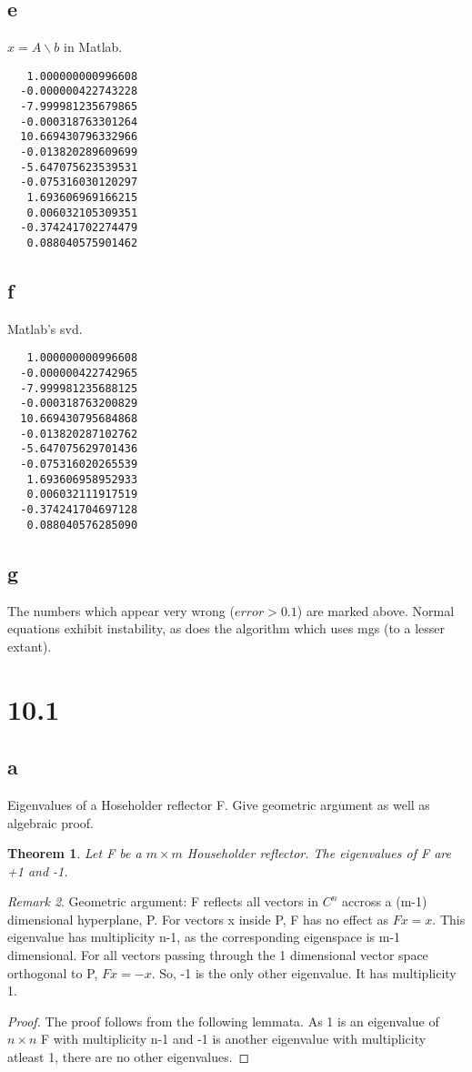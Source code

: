 \documentclass[10pt]{amsart}
\newtheorem{thm}{Theorem}[subsection]
\theoremstyle{remark}
\newtheorem{rem}[thm]{Remark}
\begin{document}
\subsection{e} $x=A\backslash b$ in Matlab.
\begin{verbatim}
   1.000000000996608
  -0.000000422743228
  -7.999981235679865
  -0.000318763301264
  10.669430796332966
  -0.013820289609699
  -5.647075623539531
  -0.075316030120297
   1.693606969166215
   0.006032105309351
  -0.374241702274479
   0.088040575901462
\end{verbatim}

\subsection{f} Matlab's svd.
\begin{verbatim}
   1.000000000996608
  -0.000000422742965
  -7.999981235688125
  -0.000318763200829
  10.669430795684868
  -0.013820287102762
  -5.647075629701436
  -0.075316020265539
   1.693606958952933
   0.006032111917519
  -0.374241704697128
   0.088040576285090
\end{verbatim}

\subsection{g} 
The numbers which appear very wrong ($error>0.1$) are marked above. Normal equations exhibit instability, as does the algorithm which uses mgs (to a lesser extant).

\section{10.1}
\subsection{a} Eigenvalues of a Hoseholder reflector F. Give geometric argument as well as algebraic proof.

\begin{thm}
 Let F be a $m \times m$ Householder reflector. The eigenvalues of F are +1 and -1.
\end{thm}
\begin{rem}
 Geometric argument: F reflects all vectors in $C^{n}$ accross a (m-1) dimensional hyperplane, P. For vectors x inside P, F has no effect as $Fx = x$. This eigenvalue has multiplicity n-1, as the corresponding eigenspace is m-1 dimensional. For all vectors passing through the 1 dimensional vector space orthogonal to P, $Fx = -x$. So, -1 is the only other eigenvalue. It has multiplicity 1.
\end{rem}
\begin{proof}
The proof follows from the following lemmata. As 1 is an eigenvalue of $n \times n$ F with multiplicity n-1 and -1 is another eigenvalue with multiplicity atleast 1, there are no other eigenvalues.
\end{proof}
\end{document}
